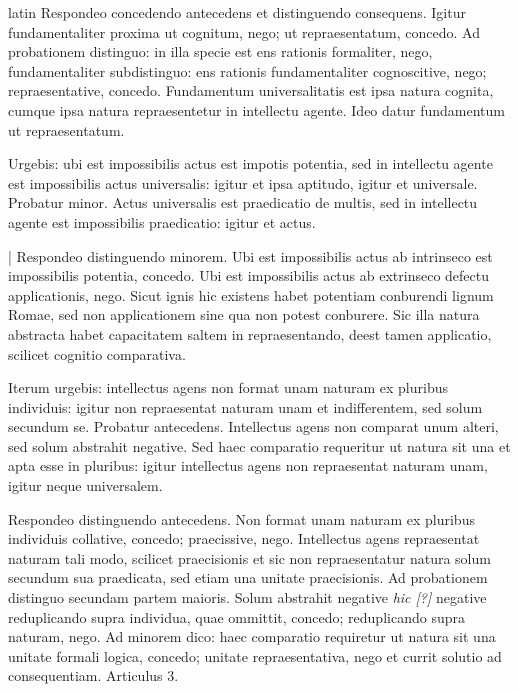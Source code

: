 \begin{otherlanguage*}{latin}
\pstart
Respondeo concedendo antecedens et distinguendo consequens. Igitur fundamentaliter proxima ut cognitum, nego; ut repraesentatum, concedo. Ad probationem distinguo:
in illa specie est ens rationis formaliter, nego, fundamentaliter subdistinguo:
ens rationis fundamentaliter cognoscitive, nego; repraesentative, concedo. Fundamentum universalitatis est ipsa natura cognita, cumque ipsa natura repraesentetur in intellectu agente. Ideo datur fundamentum ut repraesentatum. 
\pend

\pstart
Urgebis:
ubi est impossibilis actus est impotis potentia, sed in intellectu agente est impossibilis actus universalis:
igitur et ipsa aptitudo, igitur et universale. Probatur minor. Actus universalis est praedicatio de multis, sed in intellectu agente est impossibilis praedicatio:
igitur et actus. 
\pend

\pstart
\textnormal{|} Respondeo distinguendo minorem. Ubi est impossibilis actus ab intrinseco est impossibilis potentia, concedo. Ubi est impossibilis actus ab extrinseco defectu applicationis, nego. Sicut ignis hic existens habet potentiam conburendi lignum Romae, sed non applicationem sine qua non potest conburere. Sic illa natura abstracta habet capacitatem saltem in repraesentando, deest tamen applicatio, scilicet cognitio comparativa. 
\pend

\pstart
Iterum urgebis:
intellectus agens non format unam naturam ex pluribus individuis:
igitur non repraesentat naturam unam et indifferentem, sed solum secundum se. Probatur antecedens. Intellectus agens non comparat unum alteri, sed solum abstrahit negative. Sed haec comparatio requeritur ut natura sit una et apta esse in pluribus:
igitur intellectus agens non repraesentat naturam unam, igitur neque universalem. 
\pend

\pstart
Respondeo distinguendo antecedens. Non format unam naturam ex pluribus individuis collative, concedo; praecissive, nego. Intellectus agens repraesentat naturam tali modo, scilicet praecisionis et sic non repraesentatur natura solum secundum sua praedicata, sed etiam una unitate praecisionis. Ad probationem distinguo secundam partem maioris. Solum abstrahit negative \emph{hic [?]} negative reduplicando supra individua, quae ommittit, concedo; reduplicando supra naturam, nego. Ad minorem dico:
haec comparatio requiretur ut natura sit una unitate formali logica, concedo; unitate repraesentativa, nego et currit solutio ad consequentiam. Articulus 3. 
\pend

\pstart
{}
\pend


\end{otherlanguage*}
